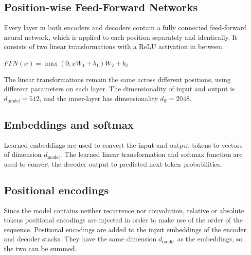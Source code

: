 \documentclass[\main/main.tex]{subfiles}
\begin{document}
\subsection{Position-wise Feed-Forward Networks}
Every layer in both encoders and decoders contain a fully connected feed-forward neural network, which is applied to each position separately and identically.
It consists of two linear transformations with a ReLU activation in between.
\begin{center}
    $FFN(x) = \max(0, xW_1 + b_1)W_2 + b_2$
\end{center}
The linear transformations remain the same across different positions, using different parameters on each layer. The dimensionality of input and output is $d_\mathrm{model} = 512$, and the inner-layer has dimensionality $d_\mathrm{ff} = 2048$.

\subsection{Embeddings and softmax}
Learned embeddings are used to convert the input and output tokens to vectors of dimension $d_\mathrm{model}$. The learned linear transformation and softmax function are used to convert the decoder output to predicted next-token probabilities.

\subsection{Positional encodings}
Since the model contains neither recurrence nor convolution, relative or absolute tokens positional encodings are injected in order to make use of the order of the sequence. Positional encodings are added to the input embeddings of the encoder and decoder stacks. They have the same dimension $d_\mathrm{model}$ as the embeddings, so the two can be summed.
\end{document}

